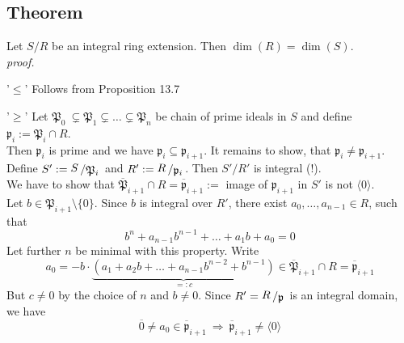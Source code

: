 \documentclass[12pt]{book}
\newcommand{\slant}[2]{{\raisebox{.1em}{$#1$}\left/\raisebox{-.1em}{$#2$}\right.}}
\begin{document}
\begin{spacing}{1.3}
\subsection{Theorem} %
Let $S/R$ be an integral ring extension. Then $\dim(R)=\dim(S)$.\\
\textit{proof.}
\begin{compactenum}
\item['$\leqslant$'] Follows from Proposition 13.7
\item['$\geqslant$'] Let $\mathfrak{P}_0 \ \subsetneq \mathfrak{P}_1 \subsetneq \ldots \subsetneq \mathfrak{P}_n$ be chain of prime ideals in $S$ and define $\mathfrak{p}_i:=\mathfrak{P}_i \cap R$.\\
Then $\mathfrak{p}_i$ is prime and we have $\mathfrak{p}_i \subseteq \mathfrak{p}_{i+1}$. It remains to show, that $\mathfrak{p}_i \neq \mathfrak{p}_{i+1}$.\\
Define $S':=\slant{S}{\mathfrak{P}_i}$ and $R':=\slant{R}{\mathfrak{p}_i}$. Then $S'/R'$ is integral (!).\\
We have to show that $\overline{\mathfrak{P}}_{i+1} \cap R=\overline{\mathfrak{p}}_{i+1}:=$ image of $\mathfrak{p}_{i+1}$ in $S'$ is not $\langle 0 \rangle$.\\
Let $b \in \mathfrak{P}_{i+1} \setminus \{0\}$. Since $b$ is integral over $R'$, there exist $a_0, \ldots, a_{n-1} \in R$, such that
$$b^n+a_{n-1}b^{n-1}+ \ldots +a_1b+a_0=0$$
Let further $n$ be minimal with this property. Write
$$a_0=-b \cdot \underbrace{\left( a_1+a_2b+ \ldots + a_{n-1}b^{n-2}+b^{n-1}\right)}_{=:c} \in \overline{\mathfrak{P}}_{i+1} \cap R=\overline{\mathfrak{p}}_{i+1}$$
But $c\neq 0$ by the choice of $n$ and $b \neq 0$. Since $R'=\slant{R}{\mathfrak{p}}$ is an integral domain, we have
$$\overline{0} \neq a_0 \in \overline{\mathfrak{p}}_{i+1} \ \Longrightarrow \ \overline{\mathfrak{p}}_{i+1} \neq \langle 0 \rangle$$
\end{compactenum}


\end{spacing}
\end{document}
